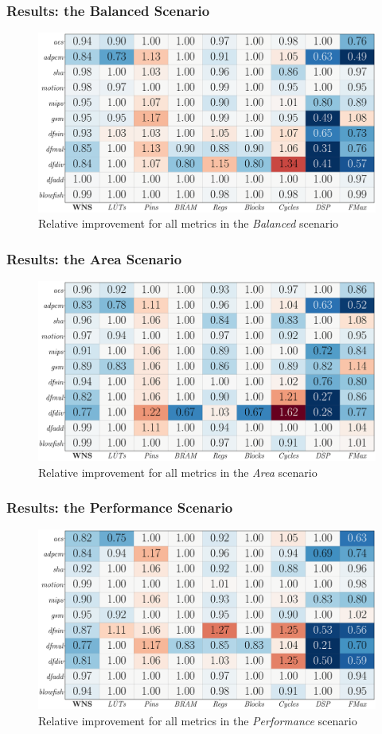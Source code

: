 \documentclass[10pt, compress, xcolor={table,xcdraw,usenames}, aspectratio=169]{beamer}
\begin{document}
\begin{frame}
    \frametitle{Results: the Balanced Scenario}
    \begin{figure}[htpb]
        \centering
        \includegraphics[width=0.8\columnwidth]{heatmap_default_stratixV}
        \caption{Relative improvement for all metrics in the \textit{Balanced}
        scenario}
    \end{figure}
\end{frame}

\begin{frame}
    \frametitle{Results: the Area Scenario}
    \begin{figure}[htpb]
        \centering
        \includegraphics[width=0.8\columnwidth]{heatmap_default_stratixV_area}
        \caption{Relative improvement for all metrics in the \textit{Area}
        scenario}
    \end{figure}
\end{frame}

\begin{frame}
    \frametitle{Results: the Performance Scenario}
    \begin{figure}[htpb]
        \centering
        \includegraphics[width=0.8\columnwidth]{heatmap_default_stratixV_perf}
        \caption{Relative improvement for all metrics in the
        \textit{Performance} scenario}
    \end{figure}
\end{frame}
\end{document}
